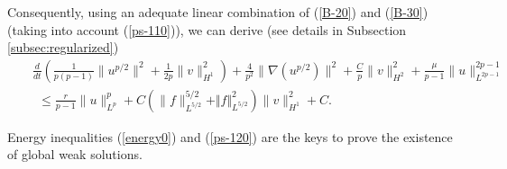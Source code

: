 \documentclass[11pt,reqno]{amsart}%
\numberwithin{equation}{section}
\begin{document}
\begin{enumerate}
\medskip

Consequently, using an adequate linear combination of (\ref{B-20}) and (\ref{B-30}) (taking into account (\ref{ps-110})), we can derive (see details in Subsection \ref{subsec:regularized})
\begin{eqnarray}
&&\frac{d}{dt}\left(\frac{1}{p(p-1)}\|u^{p/2}\|^2+\frac{1}{2p}\|v\|^2_{H^1}\right)
+\frac{4}{p^2}\|\nabla(u^{p/2})\|^2
+\frac Cp\|v\|^2_{H^2}
+\frac{\mu}{p-1}\|u\|_{L^{2p-1}}^{2p-1}\nonumber\\
&&\ \ \le \frac r{p-1}\|u\|^p_{L^p}+C\left(\|f\|^{5/2}_{L^{5/2}}+\Vert f\Vert^2_{L^{5/2}}\right)\|v\|^2_{H^1}+C.\label{ps-120} 
\end{eqnarray}
\end{enumerate}
Energy inequalities (\ref{energy0}) and (\ref{ps-120}) are the keys to prove the existence of global weak solutions.
\end{document}
